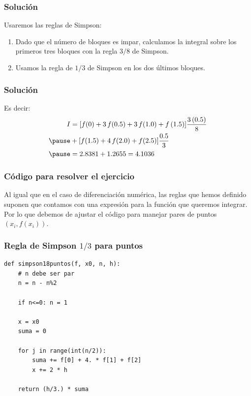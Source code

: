 \documentclass[12pt]{beamer}
\begin{document}
\begin{frame}
\frametitle{Solución}
Usaremos las reglas de Simpson:
\pause
{}
\begin{enumerate}[<+->]
\item Dado que el número de bloques es impar, calculamos la integral sobre los primeros tres bloques con la regla $3/8$ de Simpson.
\item Usamos la regla de $1/3$ de Simpson en los dos últimos bloques.
\end{enumerate}
\end{frame}
\begin{frame}
\frametitle{Solución}
Es decir:
\pause
\begin{eqnarray*}
\begin{aligned}
I &= [f (0) + 3 \, f (0.5) + 3 \, f(1.0) + f \, (1.5)]\dfrac{3 \, (0.5)}{8} \\ \pause
&+ [ f (1.5) + 4 \, f (2.0) + f (2.5)] \dfrac{0.5}{3} \\ \pause
&= 2.8381 + 1.2655 = 4.1036
\end{aligned}
\end{eqnarray*}
\end{frame}
\begin{frame}
\frametitle{Código para resolver el ejercicio}
Al igual que en el caso de diferenciación numérica, las reglas que hemos definido suponen que contamos con una expresión para la función que queremos integrar.
\\
\bigskip
\pause
Por lo que debemos de ajustar el código para manejar pares de puntos $(x_{i}, f (x_{i}))$.
\end{frame}
\begin{frame}
\frametitle{Regla de Simpson $1/3$ para puntos}
\begin{lstlisting}[caption=Regla de Simpson 1/8 para obtener la integral con pares de puntos]
def simpson18puntos(f, x0, n, h):
	# n debe ser par
	n = n - n%2

	if n<=0: n = 1

	x = x0
	suma = 0

	for j in range(int(n/2)):
		suma += f[0] + 4. * f[1] + f[2]
		x += 2 * h

	return (h/3.) * suma
\end{lstlisting}
\end{frame}
\end{document}
